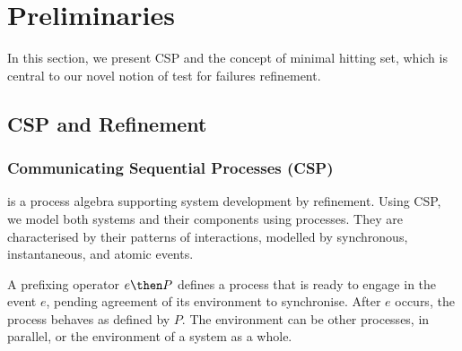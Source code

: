 \section{Preliminaries}
\label{section:preliminaries}

In this section, we present CSP and the concept of minimal hitting set, which
is central to our novel notion of test for failures refinement.

\subsection{CSP and Refinement}



\subsubsection*{Communicating Sequential Processes (CSP)} is a process algebra
supporting system development by refinement. Using CSP, we model both systems and
their components using processes. They are characterised by their patterns
of interactions, modelled by synchronous, instantaneous, and atomic events.

A prefixing operator $e \then P$ defines a process that is ready to engage in
the event $e$, pending agreement of its environment to synchronise. After $e$
occurs, the process behaves as defined by $P$. The environment can be other
processes, in parallel, or the environment of a system as a whole.

